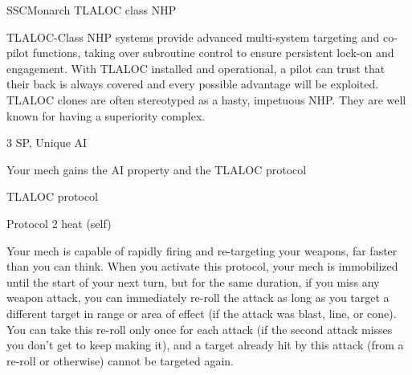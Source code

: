 \begin{mech}{SSC}{Monarch}
TLALOC class NHP

TLALOC-Class NHP systems provide advanced multi-system targeting and co-pilot functions, taking over subroutine control to ensure persistent lock-on and engagement. With TLALOC installed and operational, a pilot can trust that their back is always covered and every possible advantage will be exploited. TLALOC clones are often stereotyped as a hasty, impetuous NHP. They are well known for having a superiority complex.

3 SP, Unique
AI

Your mech gains the AI property and the TLALOC protocol

TLALOC protocol

Protocol
2 heat (self)

Your mech is capable of rapidly firing and re-targeting your weapons, far faster than you can think. When you activate this protocol, your mech is immobilized until the start of your next turn, but for the same duration, if you miss any weapon attack, you can immediately re-roll the attack as long as you target a different target in range or area of effect (if the attack was blast, line, or cone). You can take this re-roll only once for each attack (if the second attack misses you don't get to keep making it), and a target already hit by this attack (from a re-roll or otherwise) cannot be targeted again.

\end{mech}
